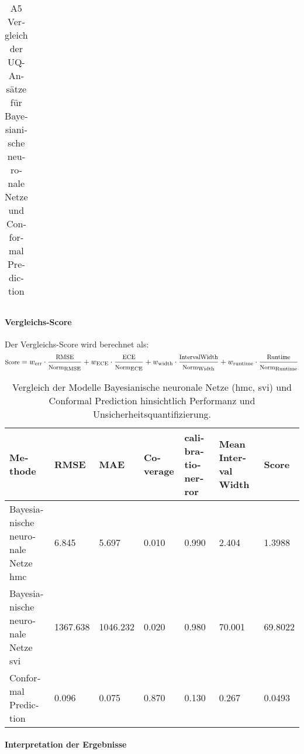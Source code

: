 \begin{otherlanguage}{ngerman}
\begin{table}[!htpb]
\begin{tabularx}{\textwidth}{|>{\centering\arraybackslash}l|X|X|}
  \end{tabularx}
  \caption{A5 Vergleich der UQ-Ansätze für \gls{Bayesianische neuronale Netze} und \gls{Conformal Prediction}}
  \label{tab:chapter6r81}
\end{table}



\paragraph{Vergleichs-Score}

Der Vergleichs-Score wird berechnet als:
{
  \[\footnotesize
  \text{Score} = w_\text{err} \cdot \frac{\text{RMSE}}{\text{Norm}_\text{RMSE}}
  + w_\text{ECE} \cdot \frac{\text{ECE}}{\text{Norm}_\text{ECE}}
  + w_\text{width} \cdot \frac{\text{IntervalWidth}}{\text{Norm}_\text{Width}}
  + w_\text{runtime} \cdot \frac{\text{Runtime}}{\text{Norm}_\text{Runtime}}
  \]
}

\begin{table}[!htbp]
  \centering
  \footnotesize
  \begin{tabularx}{\textwidth}{|>{\arraybackslash}X|X|X|X|X|X|X|}
  \hline
  \textbf{Methode} & \textbf{RMSE} & \textbf{MAE} & \textbf{Coverage} & \textbf{\gls{calibrationerror}} & \textbf{Mean Interval Width} & \textbf{Score} \\
  \hline
  \gls{Bayesianische neuronale Netze} \gls{hmc} & 6.845 & 5.697 & 0.010 & 0.990 & 2.404 & 1.3988 \\
  \hline
  \gls{Bayesianische neuronale Netze} \gls{svi} & 1367.638 & 1046.232 & 0.020 & 0.980 & 70.001 & 69.8022 \\
  \hline
  \gls{Conformal Prediction} & 0.096 & 0.075 & 0.870 & 0.130 & 0.267 & 0.0493 \\
  \hline
  \end{tabularx}
  \caption{Vergleich der Modelle \gls{Bayesianische neuronale Netze} (\gls{hmc}, \gls{svi}) und \gls{Conformal Prediction} hinsichtlich Performanz und Unsicherheitsquantifizierung.}
  \label{tab:r8_results}
\end{table}



\paragraph{Interpretation der Ergebnisse}\par


\end{otherlanguage}
